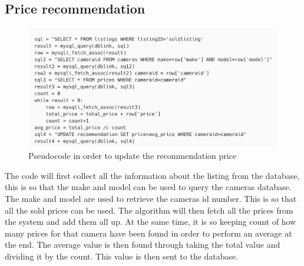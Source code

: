 \subsection{Price recommendation}
\begin{figure}[H]
    \centering
    \includegraphics[scale=0.3]{ch2_design/alg_price.png}
    \caption{Pseudocode in order to update the recommendation price}
    \label{fig:alg_price}
\end{figure}
The code will first collect all the information about the listing from the database, this is so that the make and model can be used to query the cameras database. The make and model are used to retrieve the cameras id number. This is so that all the sold prices can be used. The algorithm will then fetch all the prices from the system and add them all up. At the same time, it is so keeping count of how many prices for that camera have been found in order to perform an average at the end. The average value is then found through taking the total value and dividing it by the count. This value is then sent to the database.  

